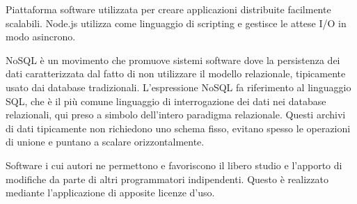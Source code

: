 
\begin{itemize}


Piattaforma software utilizzata per creare applicazioni distribuite facilmente scalabili.
Node.js utilizza  come linguaggio di scripting e gestisce le attese I/O in modo asincrono.


NoSQL è un movimento che promuove sistemi software dove la persistenza dei dati caratterizzata dal fatto di non utilizzare il modello relazionale, tipicamente usato dai database tradizionali. L'espressione NoSQL fa riferimento al linguaggio SQL, che è il più comune linguaggio di interrogazione dei dati nei database relazionali, qui preso a simbolo dell'intero paradigma relazionale.
Questi archivi di dati tipicamente non richiedono uno schema fisso, evitano spesso le operazioni di unione e puntano a scalare orizzontalmente.

\end{itemize}

\begin{itemize}


Software i cui autori ne permettono e favoriscono il libero studio e l'apporto di modifiche da parte di altri programmatori indipendenti. Questo è realizzato mediante l'applicazione di apposite licenze d'uso.

\end{itemize}


